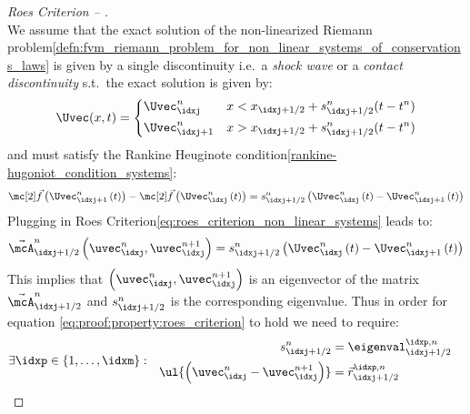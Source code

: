 \begin{proofbox}\nospacing
    \begin{proof}[Roes Criterion -- ]\label{proof:property:roes_criterion}\leavevmode\\
        We assume that the exact solution of the non-linearized Riemann problem\cref{defn:fvm_riemann_problem_for_non_linear_systems_of_conservations_laws}
        is given by a single discontinuity i.e.\ a \textit{shock wave} or a \textit{contact discontinuity} s.t.\ the exact solution is given by:
        \begin{align*}
          \Uvec(x,t)=
          \left\{
            \begin{aligned}
                &\Uvec_{\idxj}^{n}&&x<x_{\idxj+1/2}+s_{\idxj+1/2}^{n}(t-t^{n})\\
                &\Uvec_{\idxj+1}^{n}&&x>x_{\idxj+1/2}+s_{\idxj+1/2}^{n}(t-t^{n})
            \end{aligned}
          \right.
        \end{align*}
        and must satisfy the Rankine Heuginote condition\cref{rankine-hugoniot_condition_systems}:
        \begin{align*}
          \fluxvec\left(\Uvec_{\idxj+1}^{n}\left(t\right)\right)-\fluxvec\left(\Uvec_{\idxj}^{n}\left(t\right)\right)=s_{\idxj+1/2}^{n}\left(\Uvec_{\idxj}^{n}\left(t\right)-\Uvec_{\idxj+1}^{n}\left(t\right)\right)
        \end{align*}
        Plugging in Roes Criterion\cref{eq:roes_criterion_non_linear_systems} leads to:
        \begin{align}
            \linfluxvec_{\idxj+1/2}^{n}\left(\uvec_{\idxj}^{n},\uvec_{\idxj}^{n+1}\right)=s_{\idxj+1/2}^{n}\left(\Uvec_{\idxj}^{n}\left(t\right)-\Uvec_{\idxj+1}^{n}\left(t\right)\right)\label{eq:proof:property:roes_criterion}
        \end{align}
        This implies that $\left(\uvec_{\idxj}^{n},\uvec_{\idxj}^{n+1}\right)$ is an eigenvector of the matrix $\linfluxvec_{\idxj+1/2}^{n}$ and $s_{\idxj+1/2}^{n}$ is the corresponding eigenvalue.
        Thus in order for equation \cref{eq:proof:property:roes_criterion} to hold we need to require:
        \begin{align*}
          &\exists\idxp\in\left\{1,\ldots,\idxm\right\}:&&
          \begin{aligned}
              s_{\idxj+1/2}^{n}&=\eigenval_{\idxj+1/2}^{\idxp,n} \\
              \ul{\left(\uvec_{\idxj}^{n}-\uvec_{\idxj}^{n+1}\right)}&=\vec{r}_{\idxj+1/2}^{\idxp,n}

\end{aligned}
\end{align*}
\end{proof}
\end{proofbox}
